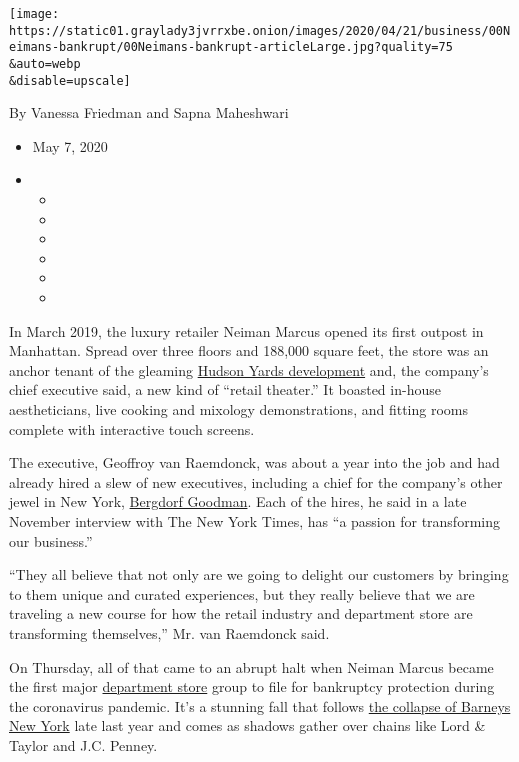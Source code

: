 \texttt{[image: https://static01.graylady3jvrrxbe.onion/images/2020/04/21/business/00Neimans-bankrupt/00Neimans-bankrupt-articleLarge.jpg?quality=75\\\&auto=webp\\\&disable=upscale]}

By Vanessa Friedman and Sapna Maheshwari

\begin{itemize}
\item
  May 7, 2020
\item
  \begin{itemize}
  \item
  \item
  \item
  \item
  \item
  \item
  \end{itemize}
\end{itemize}

In March 2019, the luxury retailer Neiman Marcus opened its first
outpost in Manhattan. Spread over three floors and 188,000 square feet,
the store was an anchor tenant of the gleaming
\href{https://www.nytimes3xbfgragh.onion/2019/04/10/style/hudson-yards-critical-shopper.html}{Hudson
Yards development} and, the company's chief executive said, a new kind
of ``retail theater.'' It boasted in-house aestheticians, live cooking
and mixology demonstrations, and fitting rooms complete with interactive
touch screens.

The executive, Geoffroy van Raemdonck, was about a year into the job and
had already hired a slew of new executives, including a chief for the
company's other jewel in New York,
\href{https://www.nytimes3xbfgragh.onion/2019/12/12/style/bergdorf-goodman-darcy-penick.html}{Bergdorf
Goodman}. Each of the hires, he said in a late November interview with
The New York Times, has ``a passion for transforming our business.''

``They all believe that not only are we going to delight our customers
by bringing to them unique and curated experiences, but they really
believe that we are traveling a new course for how the retail industry
and department store are transforming themselves,'' Mr. van Raemdonck
said.

On Thursday, all of that came to an abrupt halt when Neiman Marcus
became the first major
\href{https://www.nytimes3xbfgragh.onion/2020/04/21/business/coronavirus-department-stores-neiman-marcus.html?searchResultPosition=3}{department
store} group to file for bankruptcy protection during the coronavirus
pandemic. It's a stunning fall that follows
\href{https://www.nytimes3xbfgragh.onion/2019/11/01/business/barneys-bankruptcy-authentic-brands.html}{the
collapse of Barneys New York} late last year and comes as shadows gather
over chains like Lord \& Taylor and J.C. Penney.


